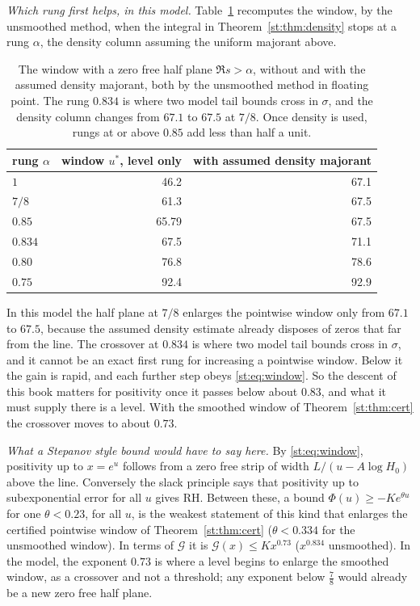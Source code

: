 \emph{Which rung first helps, in this model.} Table~\ref{st:tab:gap} recomputes the window, by the unsmoothed method, when the integral in Theorem~\ref{st:thm:density} stops at a rung $\alpha$, the density column assuming the uniform majorant above.
\begin{table}[h]\centering\small
\begin{tabular}{lrr}
\toprule
rung $\alpha$ & window $u^*$, level only & with assumed density majorant\\
\midrule
$1$ & 46.2 & 67.1\\
$7/8$ & 61.3 & 67.5\\
$0.85$ & 65.79 & 67.5\\
$0.834$ & 67.5 & 71.1\\
$0.80$ & 76.8 & 78.6\\
$0.75$ & 92.4 & 92.9\\
\bottomrule
\end{tabular}
\caption{The window with a zero free half plane $\Re s>\alpha$, without and with the assumed density majorant, both by the unsmoothed method in floating point. The rung $0.834$ is where two model tail bounds cross in $\sigma$, and the density column changes from $67.1$ to $67.5$ at $7/8$. Once density is used, rungs at or above $0.85$ add less than half a unit.}\label{st:tab:gap}
\end{table}
In this model the half plane at $7/8$ enlarges the pointwise window only from $67.1$ to $67.5$, because the assumed density estimate already disposes of zeros that far from the line. The crossover at $0.834$ is where two model tail bounds cross in $\sigma$, and it cannot be an exact first rung for increasing a pointwise window. Below it the gain is rapid, and each further step obeys \eqref{st:eq:window}. So the descent of this book matters for positivity once it passes below about $0.83$, and what it must supply there is a level. With the smoothed window of Theorem~\ref{st:thm:cert} the crossover moves to about $0.73$.

\emph{What a Stepanov style bound would have to say here.} By \eqref{st:eq:window}, positivity up to $x=e^u$ follows from a zero free strip of width $L/(u-A\log H_0)$ above the line. Conversely the slack principle says that positivity up to subexponential error for all $u$ gives RH. Between these, a bound $\Phi(u)\ge-Ke^{\theta u}$ for one $\theta<0.23$, for all $u$, is the weakest statement of this kind that enlarges the certified pointwise window of Theorem~\ref{st:thm:cert} ($\theta<0.334$ for the unsmoothed window). In terms of $\mathcal G$ it is $\mathcal G(x)\le Kx^{0.73}$ ($x^{0.834}$ unsmoothed). In the model, the exponent $0.73$ is where a level begins to enlarge the smoothed window, as a crossover and not a threshold; any exponent below $\tfrac78$ would already be a new zero free half plane.


